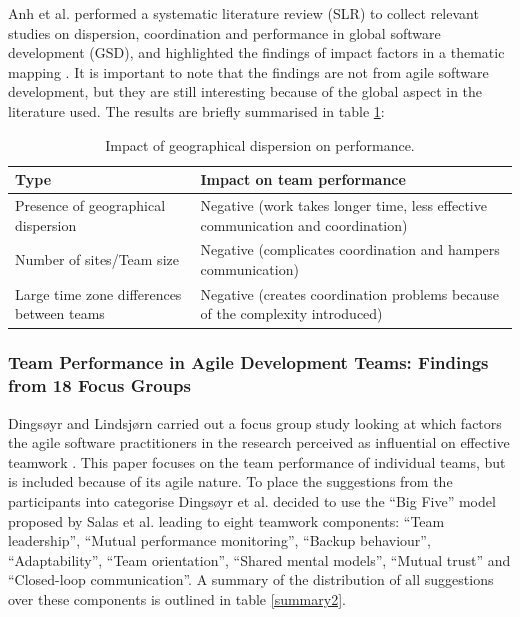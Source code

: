 Anh et al. performed a systematic literature review (SLR) to collect relevant studies on dispersion, coordination and performance in global software development (GSD), and highlighted the findings of impact factors in a thematic mapping \cite{Anh2012}. It is important to note that the findings are not from agile software development, but they are still interesting because of the global aspect in the literature used. The results are briefly summarised in table \ref{GSD}:

\begin{table}[H]
\begin{center}
    \begin{tabular}{ | p{5cm} | p{8cm} |}
    \hline
    \textbf{Type} & \textbf{Impact on team performance} \\ \hline
    Presence of geographical dispersion & Negative (work takes longer time, less effective communication and coordination) \\ \hline
    Number of sites/Team size & Negative (complicates coordination and hampers communication) \\ \hline
    Large time zone differences between teams & Negative (creates coordination problems because of the complexity introduced) \\ \hline
    \end{tabular}
    \caption{Impact of geographical dispersion on performance.}
    \label{GSD}
\end{center}
\end{table}

\subsubsection{Team Performance in Agile Development Teams: Findings from 18 Focus Groups}

Dingsøyr and Lindsjørn carried out a focus group study looking at which factors the agile software practitioners in the research perceived as influential on effective teamwork \cite{Dingsoyr2013c}. This paper focuses on the team performance of individual teams, but is included because of its agile nature. To place the suggestions from the participants into categorise Dingsøyr et al. decided to use the ``Big Five'' model proposed by Salas et al. \cite{Salas2005} leading to eight teamwork components: ``Team leadership'', ``Mutual performance monitoring'', ``Backup behaviour'', ``Adaptability'', ``Team orientation'', ``Shared mental models'', ``Mutual trust'' and ``Closed-loop communication''. A summary of the distribution of all suggestions over these components is outlined in table \ref{summary2}.


